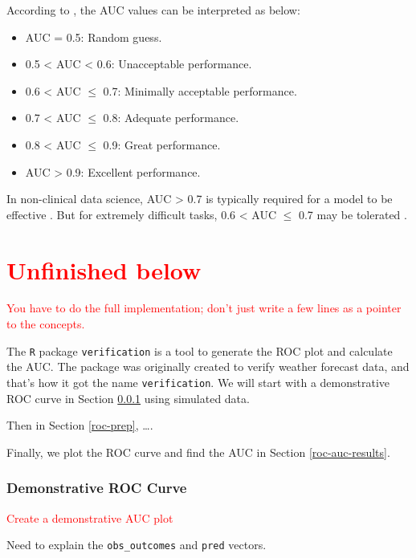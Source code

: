 \documentclass[
]{article}
\begin{document}
According to \citet{yang2017receiver}, the AUC values can be interpreted
as below:

\begin{itemize}
\item
  AUC = 0.5: Random guess.
\item
  0.5 \textless{} AUC \textless{} 0.6: Unacceptable performance.
\item
  0.6 \textless{} AUC \(\leq\) 0.7: Minimally acceptable performance.
\item
  0.7 \textless{} AUC \(\leq\) 0.8: Adequate performance.
\item
  0.8 \textless{} AUC \(\leq\) 0.9: Great performance.
\item
  AUC \textgreater{} 0.9: Excellent performance.
\end{itemize}

In non-clinical data science, AUC \textgreater{} 0.7 is typically
required for a model to be effective \citep{han2022utility}. But for
extremely difficult tasks, 0.6 \textless{} AUC \(\leq\) 0.7 may be
tolerated \citep{kanter2015deep}.

\section*{\textcolor{red}{Unfinished below}}

\textcolor{red}{You have to do the full implementation; don't just write a few lines as a pointer to the concepts.}

The \texttt{R} package \texttt{verification} \citep{r-auc-verification}
is a tool to generate the ROC plot and calculate the AUC. The package
was originally created to verify weather forecast data, and that's how
it got the name \texttt{verification}. We will start with a
demonstrative ROC curve in Section \ref{roc-demo} using simulated data.

Then in Section \ref{roc-prep}, \ldots.

Finally, we plot the ROC curve and find the AUC in Section
\ref{roc-auc-results}.

\hypertarget{roc-demo}{%
\subsubsection{Demonstrative ROC Curve}\label{roc-demo}}

\textcolor{red}{Create a demonstrative AUC plot}

Need to explain the \texttt{obs\_outcomes} and \texttt{pred} vectors.
\end{document}
